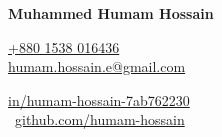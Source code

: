 {\noindent\fontsize{24pt}{29pt}\bfseries Muhammed Humam Hossain\par}
\vspace{0.5em}
\noindent
\begin{minipage}[t]{0.50\textwidth}
    \raggedright
    \href{tel:+8801538016436}{+880 1538 016436} \\ 
    \href{mailto:humam.hossain.e@gmail.com}{humam.hossain.e@gmail.com}
\end{minipage}%
\hfill
\begin{minipage}[t]{0.50\textwidth}
    \raggedleft
    \href{https://www.linkedin.com/in/humam-hossain-7ab762230/}{in/humam-hossain-7ab762230} \faLinkedin\\\
    \href{https://github.com/humam-hossain}{github.com/humam-hossain} \faGithub\
\end{minipage}

\vspace{1.2em}